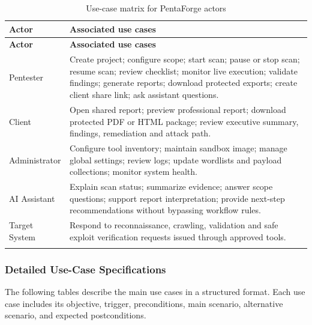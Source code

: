 \documentclass[12pt,a4paper]{report}
\begin{document}
\begin{longtable}{|p{}|p{}|}
\hline
\textbf{Actor} & \textbf{Associated use cases} \\
\hline
\endfirsthead
\hline
\textbf{Actor} & \textbf{Associated use cases} \\
\hline
\endhead
Pentester & Create project; configure scope; start scan; pause or stop scan; resume
scan; review checklist; monitor live execution; validate findings; generate reports;
download protected exports; create client share link; ask assistant questions. \\
\hline
Client & Open shared report; preview professional report; download protected PDF or
HTML package; review executive summary, findings, remediation and attack path. \\
\hline
Administrator & Configure tool inventory; maintain sandbox image; manage global
settings; review logs; update wordlists and payload collections; monitor system
health. \\
\hline
AI Assistant & Explain scan status; summarize evidence; answer scope questions;
support report interpretation; provide next-step recommendations without bypassing
workflow rules. \\
\hline
Target System & Respond to reconnaissance, crawling, validation and safe exploit
verification requests issued through approved tools. \\
\hline
\caption{Use-case matrix for PentaForge actors}
\label{tab:use_case_matrix}
\end{longtable}

\subsubsection{Detailed Use-Case Specifications}

The following tables describe the main use cases in a structured format. Each use case
includes its objective, trigger, preconditions, main scenario, alternative scenario,
and expected postconditions.
\end{document}
